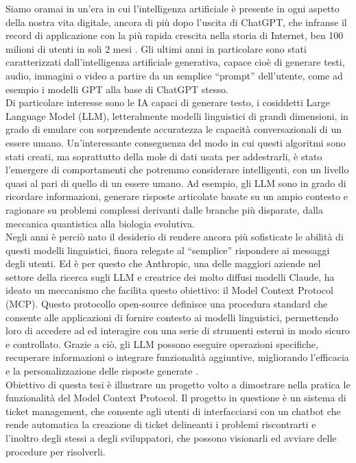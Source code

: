 ﻿Siamo oramai in un'era in cui l'intelligenza artificiale è presente in ogni aspetto della nostra vita digitale, 
ancora di più dopo l'uscita di ChatGPT, che infranse il record di applicazione con la più rapida crescita nella storia di Internet, 
ben 100 milioni di utenti in soli 2 mesi \cite{ubs2023latest}. Gli ultimi anni in particolare sono stati caratterizzati dall’intelligenza 
artificiale generativa, capace cioè di generare testi, audio, immagini o video a partire da un semplice “prompt” dell’utente, come ad esempio i
 modelli GPT alla base di ChatGPT stesso. \\
Di particolare interesse sono le IA capaci di generare testo, i cosiddetti Large Language Model (LLM), letteralmente modelli linguistici 
di grandi dimensioni, in grado di emulare con sorprendente accuratezza le capacità conversazionali di un essere umano. Un'interessante 
conseguenza del modo in cui questi algoritmi sono stati creati, ma soprattutto della mole di dati usata per addestrarli, è stato l’emergere 
di comportamenti che potremmo considerare intelligenti, con un livello quasi al pari di quello di un essere umano. Ad esempio, gli LLM sono 
in grado di ricordare informazioni, generare risposte articolate basate su un ampio contesto e ragionare su problemi complessi derivanti 
dalle branche più disparate, dalla meccanica quantistica alla biologia evolutiva. \\
Negli anni è perciò nato il desiderio di rendere ancora più sofisticate le abilità di questi modelli linguistici, finora relegate al 
“semplice” rispondere ai messaggi degli utenti. Ed è per questo che Anthropic, una delle maggiori aziende nel settore della ricerca sugli LLM
 e creatrice dei molto diffusi modelli Claude, ha ideato un meccanismo che facilita questo obiettivo: il Model Context Protocol (MCP). 
 Questo protocollo open-source definisce una procedura standard che consente alle applicazioni di fornire contesto ai modelli linguistici, 
 permettendo loro di accedere ad ed interagire con una serie di strumenti esterni in modo sicuro e controllato. Grazie a ciò, gli LLM possono 
 eseguire operazioni specifiche, recuperare informazioni o integrare funzionalità aggiuntive, migliorando l’efficacia e la personalizzazione 
 delle risposte generate \cite{modelcontextprotocol2024}. \\
Obiettivo di questa tesi è illustrare un progetto volto a dimostrare nella pratica le funzionalità del Model Context Protocol. Il progetto 
in questione è un sistema di ticket management, che consente agli utenti di interfacciarsi con un chatbot che rende automatica la creazione 
di ticket delineanti i problemi riscontrarti e l'inoltro degli stessi a degli sviluppatori, che possono visionarli ed avviare delle procedure 
per risolverli.

